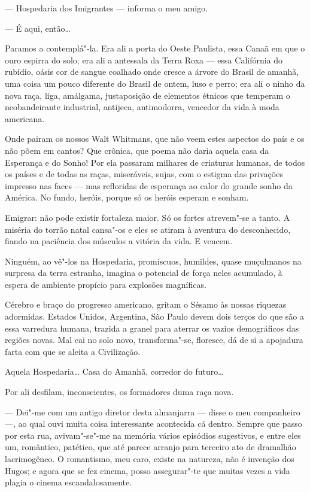 --- Hospedaria dos Imigrantes --- informa o meu amigo.

--- É aqui, então\ldots{}

Paramos a contemplá"-la. Era ali a porta do Oeste Paulista, essa Canaã em
que o ouro espirra do solo; era ali a antessala da Terra Roxa --- essa
Califórnia do rubídio, oásis cor de sangue coalhado onde cresce a árvore
do Brasil de amanhã, uma coisa um pouco diferente do Brasil de ontem,
luso e perro; era ali o ninho da nova raça, liga, amálgama, justaposição
de elementos étnicos que temperam o neobandeirante industrial, antijeca,
antimodorra, vencedor da vida à moda americana.

Onde pairam os nossos Walt Whitmans, que não veem estes aspectos do país
e os não põem em cantos? Que crônica, que poema não daria aquela casa da
Esperança e do Sonho! Por ela passaram milhares de criaturas humanas, de
todos os países e de todas as raças, miseráveis, sujas, com o estigma
das privações impresso nas faces --- mas refloridas de esperança ao
calor do grande sonho da América. No fundo, heróis, porque só os heróis
esperam e sonham.

Emigrar: não pode existir fortaleza maior. Só os fortes atrevem"-se a
tanto. A miséria do torrão natal cansa"-os e eles se atiram à aventura do
desconhecido, fiando na paciência dos músculos a vitória da vida. E
vencem.

Ninguém, ao vê"-los na Hospedaria, promíscuos, humildes, quase muçulmanos
na surpresa da terra estranha, imagina o potencial de força neles
acumulado, à espera de ambiente propício para explosões magníficas.

Cérebro e braço do progresso americano, gritam o Sésamo às nossas
riquezas adormidas. Estados Unidos, Argentina, São Paulo devem dois
terços do que são a essa varredura humana, trazida a granel para aterrar
os vazios demográficos das regiões novas. Mal cai no solo novo,
transforma"-se, floresce, dá de si a apojadura farta com que se aleita a
Civilização.

Aquela Hospedaria\ldots{} Casa do Amanhã, corredor do futuro\ldots{}

Por ali desfilam, inconscientes, os formadores duma raça nova.

--- Dei"-me com um antigo diretor desta almanjarra --- disse o meu
companheiro ---, ao qual ouvi muita coisa interessante acontecida cá
dentro. Sempre que passo por esta rua, avivam"-se"-me na memória vários
episódios sugestivos, e entre eles um, romântico, patético, que até
parece arranjo para terceiro ato de dramalhão lacrimogêneo. O
romantismo, meu caro, existe na natureza, não é invenção dos Hugos; e
agora que se fez cinema, posso assegurar"-te que muitas vezes a vida
plagia o cinema escandalosamente.

